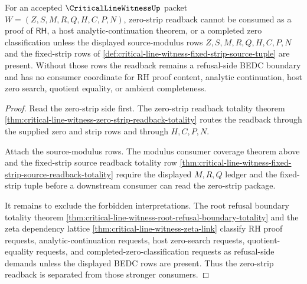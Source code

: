 \begin{theorem}
\label{thm:critical-line-witness-zero-strip-readback-separation}
For an accepted $\CriticalLineWitnessUp$ packet $W=(Z,S,M,R,Q,H,C,P,N)$, zero-strip readback cannot be consumed as a proof of $\mathsf{RH}$, a host analytic-continuation theorem, or a completed zero classification unless the displayed source-modulus rows $Z,S,M,R,Q,H,C,P,N$ and the fixed-strip rows of \autoref{def:critical-line-witness-fixed-strip-source-tuple} are present. Without those rows the readback remains a refusal-side BEDC boundary and has no consumer coordinate for RH proof content, analytic continuation, host zero search, quotient equality, or ambient completeness.
\end{theorem}
\begin{proof}
Read the zero-strip side first. The zero-strip readback totality theorem \autoref{thm:critical-line-witness-zero-strip-readback-totality} routes the readback through the supplied zero and strip rows and through $H,C,P,N$.

Attach the source-modulus rows. The modulus consumer coverage theorem above and the fixed-strip source readback totality row \autoref{thm:critical-line-witness-fixed-strip-source-readback-totality} require the displayed $M,R,Q$ ledger and the fixed-strip tuple before a downstream consumer can read the zero-strip package.

It remains to exclude the forbidden interpretations. The root refusal boundary totality theorem \autoref{thm:critical-line-witness-root-refusal-boundary-totality} and the zeta dependency lattice \autoref{thm:critical-line-witness-zeta-link} classify RH proof requests, analytic-continuation requests, host zero-search requests, quotient-equality requests, and completed-zero-classification requests as refusal-side demands unless the displayed BEDC rows are present. Thus the zero-strip readback is separated from those stronger consumers.
\end{proof}

